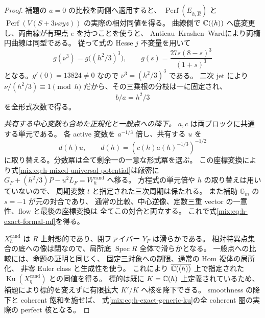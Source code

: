 \begin{proof}
補題の $a=0$ の比較を両側へ適用すると、
$\operatorname{Perf}(E_{h,\widehat R})$ と
$\operatorname{Perf}(V(S+3\nu xyz))$ の実際の相対同値を得る。
曲線側で $\mathbb C((h))$ へ底変更し、両曲線が有理点 $e$ を持つことを使うと、
Antieau--Krashen--Ward\cite[Theorem~2.2]{GRAKW}により両楕円曲線は同型である。
従って式の Hesse $j$ 不変量を用いて
\[
 g(\nu^3)=g\bigl((h^2/3)^3\bigr),\qquad
 g(s)=\frac{27s(8-s)^3}{(1+s)^3}
\]
となる。$g'(0)=13824\ne0$ なので $\nu^3=(h^2/3)^3$ である。
二次 jet により $\nu/(h^2/3)\equiv1\pmod h$ だから、その三乗根の分枝は一に固定され、
\begin{equation}\label{mix:eq:h-exact-hesse-ratio}
 b/a=h^2/3
\end{equation}
を全形式次数で得る。

\emph{共有する中心変数も含めた正規化と一般点への降下。}
$a,c$ は両ブロックに共通する単元である。
各 active 変数を $a^{-1/3}$ 倍し、共有する $u$ を
\[
 d(h)u,\qquad d(h)=(c(h)a(h)^{-1/3})^{-1/2}
\]
に取り替える。分数冪は全て剰余一の一意な形式冪を選ぶ。
この座標変換により式\eqref{mix:eq:h-mixed-universal-potential}は厳密に
$G_F+(h^2/3)P-u^2L_F=W_h^{\mathrm{cand}}$ へ移る。
方程式の単元倍や $h$ の取り替えは用いていないので、
周期変数 $t$ と指定された三次周期は保たれる。
また補助 $\mathbb G_m$ の $s=-1$ が元の対合であり、
通常の比較、中心逆像、定数三重 vector の一意性、flow と最後の座標変換は
全てこの対合と両立する。
これで式\eqref{mix:eq:h-exact-formal-mf}を得る。

$X_h^{\mathrm{cand}}$ は $R$ 上射影的であり、閉ファイバー $Y_F$ は滑らかである。
相対特異点集合の底への像は閉なので、局所底 $\operatorname{Spec}R$ 全体で滑らかとなる。
一般点への比較には、命題の証明と同じく、
固定三対象への制限、通常の Hom 複体の局所化、
非零 Euler class と生成性を使う。
これにより $\overline{\mathbb C((h))}$ 上で指定された
$\operatorname{Ku}(X_\eta^{\mathrm{cand}})$ との同値を得る。
標的は既に $K=\mathbb C(h)$ 上定義されているため、
補題により標的を変えずに有限拡大 $K'/K$ へ核を降下できる。
smoothness の降下と coherent 飽和を施せば、
式\eqref{mix:eq:h-exact-generic-ku}の全 coherent 圏の実際の perfect 核となる。
\end{proof}

